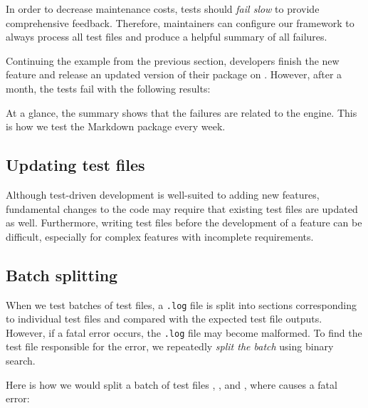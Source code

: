 \documentclass[final]{ltugboat}
\begin{document}
In order to decrease maintenance costs, tests should \emph{fail slow} to provide comprehensive feedback. Therefore, maintainers can configure our framework to always process all test files and produce a helpful summary of all failures.

Continuing the example from the previous section, developers finish the new feature and release an updated version of their package on . However, after a month, the tests fail with the following results:

\medskip
\noindent
\begingroup
\centering

\par
\endgroup

\medskip
\noindent
At a glance, the summary shows that the failures are related to the  engine. This is how we test the Markdown package every week.

\subsection{Updating test files}

Although test-driven development is well-suited to adding new features, fundamental changes to the code may require that existing test files are updated as well. Furthermore, writing test files before the development of a feature can be difficult, especially for complex features with incomplete requirements.



\subsection{Batch splitting}

When we test batches of test files, a \texttt{.log} file is split into sections corresponding to individual test files and compared with the expected test file outputs. However, if a fatal error occurs, the \texttt{.log} file may become malformed. To find the test file responsible for the error, we repeatedly \emph{split the batch} using binary search.

Here is how we would split a batch of test files , , and , where  causes a fatal error:

\medskip
\noindent
\begingroup
\centering

\par
\endgroup
\end{document}
